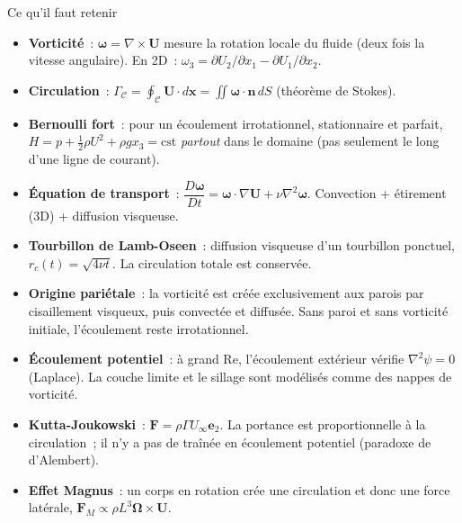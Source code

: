 \documentclass[11pt,a4paper]{report}
\begin{document}
\begin{importantbox}{Ce qu'il faut retenir}
\begin{itemize}
  \item \textbf{Vorticit\'e}~: $\boldsymbol{\omega} = \nabla\times\bm{U}$ mesure
        la rotation locale du fluide (deux fois la vitesse angulaire). En 2D~:
        $\omega_3 = \partial U_2/\partial x_1 - \partial U_1/\partial x_2$.

  \item \textbf{Circulation}~:
        $\Gamma_{\mathcal{C}} = \oint_{\mathcal{C}}\bm{U}\cdot d\bm{x}
        = \iint\boldsymbol{\omega}\cdot\bm{n}\,dS$ (th\'eor\`eme de Stokes).

  \item \textbf{Bernoulli fort}~: pour un \'ecoulement irrotationnel, stationnaire et
        parfait, $H = p + \tfrac{1}{2}\rho U^2 + \rho g x_3 = \mathrm{cst}$
        \emph{partout} dans le domaine (pas seulement le long d'une ligne de courant).

  \item \textbf{\'Equation de transport}~:
        $\dfrac{D\boldsymbol{\omega}}{Dt}
        = \boldsymbol{\omega}\cdot\nabla\bm{U} + \nu\nabla^2\boldsymbol{\omega}$.
        Convection + \'etirement (3D) + diffusion visqueuse.

  \item \textbf{Tourbillon de Lamb-Oseen}~: diffusion visqueuse d'un tourbillon
        ponctuel, $r_c(t) = \sqrt{4\nu t}$. La circulation totale est conserv\'ee.

  \item \textbf{Origine pari\'etale}~: la vorticit\'e est cr\'e\'ee exclusivement aux
        parois par cisaillement visqueux, puis convect\'ee et diffus\'ee. Sans paroi
        et sans vorticit\'e initiale, l'\'ecoulement reste irrotationnel.

  \item \textbf{\'Ecoulement potentiel}~: \`a grand Re, l'\'ecoulement ext\'erieur
        v\'erifie $\nabla^2\psi = 0$ (Laplace). La couche limite et le sillage sont
        mod\'elis\'es comme des nappes de vorticit\'e.

  \item \textbf{Kutta-Joukowski}~: $\bm{F} = \rho\Gamma U_\infty\bm{e}_2$.
        La portance est proportionnelle \`a la circulation~; il n'y a pas de tra\^in\'ee
        en \'ecoulement potentiel (paradoxe de d'Alembert).

  \item \textbf{Effet Magnus}~: un corps en rotation cr\'ee une circulation et donc une
        force lat\'erale, $\bm{F}_M \propto \rho L^3\boldsymbol{\Omega}\times\bm{U}$.
\end{itemize}
\end{importantbox}
\end{document}
